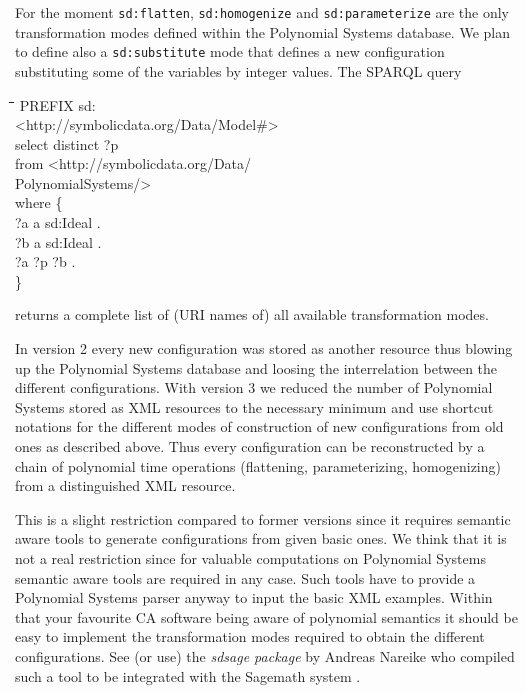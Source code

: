 \documentclass[a4paper,11pt]{article}
\newenvironment{code}{\par\small\tt\footnotesize \begin{tabbing}
\hskip12pt\=\hskip12pt\=\hskip12pt\=\hskip12pt\=\hskip5cm\=\hskip5cm\=\kill}
{\end{tabbing}\normalsize}
\begin{document}
\begin{multicols}{2}
For the moment \texttt{sd:flatten}, \texttt{sd:homogenize} and
{}\texttt{sd:parameterize} are the only transformation modes defined within
the {\SD} Polynomial Systems database. We plan to define also a
\texttt{sd:substitute} mode that defines a new configuration substituting some
of the variables by integer values.  The SPARQL query
\begin{code}
  PREFIX sd:\\\> <http://symbolicdata.org/Data/Model\#> \\
  select distinct ?p \\
  from <http://symbolicdata.org/Data/\\\>\> PolynomialSystems/>\\
  where \{ \+\\
    ?a a sd:Ideal . \\
    ?b a sd:Ideal . \\
    ?a ?p ?b . \-\\
  \}
\end{code}
returns a complete list of (URI names of) all available transformation modes.

In {\SD} version 2 every new configuration was stored as another resource thus
blowing up the Polynomial Systems database and loosing the interrelation
between the different configurations.  With {\SD} version 3 we reduced the
number of Polynomial Systems stored as XML resources to the necessary minimum
and use shortcut notations for the different modes of construction of new
configurations from old ones as described above.  Thus every configuration can
be reconstructed by a chain of polynomial time operations (flattening,
parameterizing, homogenizing) from a distinguished XML resource.

This is a slight restriction compared to former {\SD} versions since it
requires semantic aware tools to generate configurations from given basic ones.
We think that it is not a real restriction since for valuable computations on
Polynomial Systems semantic aware tools are required in any case.  Such tools
have to provide a Polynomial Systems parser anyway to input the basic XML
examples. Within that your favourite CA software being aware of polynomial
semantics it should be easy to implement the transformation modes required to
obtain the different configurations.  See (or use) the \emph{sdsage package}
\cite{sdsage} by Andreas Nareike who compiled such a tool to be integrated with
the Sagemath system \cite{Sagemath}.



\end{multicols}
\end{document}
